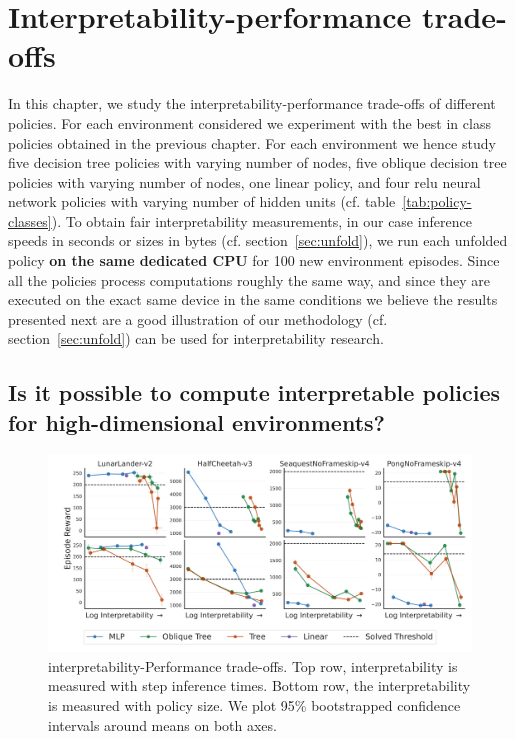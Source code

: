 \chapter{Interpretability-performance trade-offs}\label{sec:exps2}
In this chapter, we study the interpretability-performance trade-offs of different policies.
For each environment considered we experiment with the best in class policies obtained in the previous chapter.  
For each environment we hence study five decision tree policies with varying number of nodes, five oblique decision tree policies with varying number of nodes, one linear policy, and four relu neural network policies with varying number of hidden units (cf. table~\ref{tab:policy-classes}).
To obtain fair interpretability measurements, in our case inference speeds in seconds or sizes in bytes (cf. section~\ref{sec:unfold}), we run each unfolded policy \textbf{on the same dedicated CPU} for 100 new environment episodes.
Since all the policies process computations roughly the same way, and since they are executed on the exact same device in the same conditions we believe the results presented next are a good illustration of our methodology (cf. section~\ref{sec:unfold}) 
can be used for interpretability research.
\section{Is it possible to compute interpretable policies for high-dimensional environments?}

\begin{figure}
    \centering
    \includegraphics[trim={1.4cm 0 0 0},clip,width=1\textwidth]{images/images_part3/trade_off_select_combine_one_plot.pdf}
    \caption{interpretability-Performance trade-offs. Top row, interpretability is measured with step inference times. Bottom row, the interpretability is measured with policy size. We plot 95\% bootstrapped confidence intervals around means on both axes.}
    \label{fig:trade-off-summary}
\end{figure}

